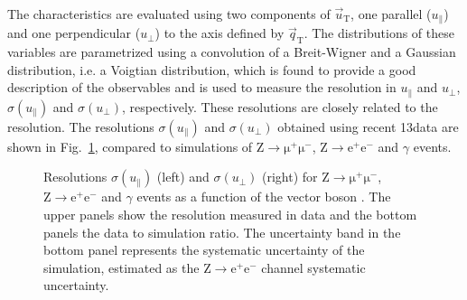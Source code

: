 The \MET characteristics are evaluated using two components of $\vec{u}_\mathrm{T}$, one parallel ($u_\parallel$) and one perpendicular ($u_\perp$) to the axis defined by $\vec{q}_\mathrm{T}$. The distributions of these variables are parametrized using a convolution of a Breit-Wigner and a Gaussian distribution, i.e. a Voigtian distribution, which is found to provide a good description of the observables and is used to measure the resolution in $u_\parallel$ and $u_\perp$, $\sigma(u_\parallel)$ and $\sigma(u_\perp)$, respectively. These resolutions are closely related to the \MET resolution. The resolutions $\sigma(u_\parallel)$ and $\sigma(u_\perp)$ obtained using recent 13\TeV data are shown in Fig.~\ref{fig:metres}, compared to simulations of $\mathrm{Z\to\mu^+\mu^-}$, $\mathrm{Z\to e^+ e^-}$ and $\gamma$ events.

\begin{figure}[htb]
\centering
{}
\caption{Resolutions $\sigma(u_\parallel)$ (left) and $\sigma(u_\perp)$ (right) for $\mathrm{Z\to\mu^+\mu^-}$, $\mathrm{Z\to e^+ e^-}$ and $\gamma$ events as a function of the vector boson \pt. The upper panels show the resolution measured in data and the bottom panels the data to simulation ratio. The uncertainty band in the bottom panel represents the systematic uncertainty of the simulation, estimated as the $\mathrm{Z\to e^+ e^-}$ channel systematic uncertainty.}\label{fig:metres}
\end{figure}
